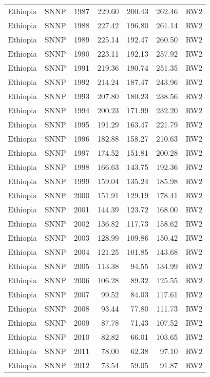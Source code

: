 \begin{longtable}{lllrrrl}
  Ethiopia & SNNP & 1987 & 229.60 & 200.43 & 262.46 & RW2 \\ 
  Ethiopia & SNNP & 1988 & 227.42 & 196.80 & 261.14 & RW2 \\ 
  Ethiopia & SNNP & 1989 & 225.14 & 192.47 & 260.50 & RW2 \\ 
  Ethiopia & SNNP & 1990 & 223.11 & 192.13 & 257.92 & RW2 \\ 
  Ethiopia & SNNP & 1991 & 219.36 & 190.74 & 251.35 & RW2 \\ 
  Ethiopia & SNNP & 1992 & 214.24 & 187.47 & 243.96 & RW2 \\ 
  Ethiopia & SNNP & 1993 & 207.80 & 180.23 & 238.56 & RW2 \\ 
  Ethiopia & SNNP & 1994 & 200.23 & 171.99 & 232.20 & RW2 \\ 
  Ethiopia & SNNP & 1995 & 191.29 & 163.47 & 221.79 & RW2 \\ 
  Ethiopia & SNNP & 1996 & 182.88 & 158.27 & 210.63 & RW2 \\ 
  Ethiopia & SNNP & 1997 & 174.52 & 151.81 & 200.28 & RW2 \\ 
  Ethiopia & SNNP & 1998 & 166.63 & 143.75 & 192.36 & RW2 \\ 
  Ethiopia & SNNP & 1999 & 159.04 & 135.24 & 185.98 & RW2 \\ 
  Ethiopia & SNNP & 2000 & 151.91 & 129.19 & 178.41 & RW2 \\ 
  Ethiopia & SNNP & 2001 & 144.39 & 123.72 & 168.00 & RW2 \\ 
  Ethiopia & SNNP & 2002 & 136.82 & 117.73 & 158.62 & RW2 \\ 
  Ethiopia & SNNP & 2003 & 128.99 & 109.86 & 150.42 & RW2 \\ 
  Ethiopia & SNNP & 2004 & 121.25 & 101.85 & 143.68 & RW2 \\ 
  Ethiopia & SNNP & 2005 & 113.38 & 94.55 & 134.99 & RW2 \\ 
  Ethiopia & SNNP & 2006 & 106.28 & 89.32 & 125.55 & RW2 \\ 
  Ethiopia & SNNP & 2007 & 99.52 & 84.03 & 117.61 & RW2 \\ 
  Ethiopia & SNNP & 2008 & 93.44 & 77.80 & 111.73 & RW2 \\ 
  Ethiopia & SNNP & 2009 & 87.78 & 71.43 & 107.52 & RW2 \\ 
  Ethiopia & SNNP & 2010 & 82.82 & 66.01 & 103.65 & RW2 \\ 
  Ethiopia & SNNP & 2011 & 78.00 & 62.38 & 97.10 & RW2 \\ 
  Ethiopia & SNNP & 2012 & 73.54 & 59.05 & 91.87 & RW2 \\ 

\end{longtable}
